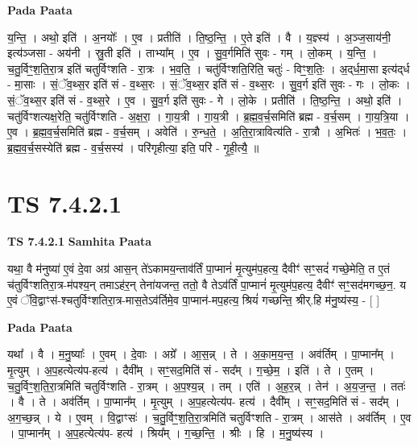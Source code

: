 \documentclass[17pt]{extarticle}
\begin{document}
\textbf{Pada Paata} \newline

य॒न्ति॒ । अथो॒ इति॑ । अ॒नयोः᳚ । ए॒व । प्रतीति॑ । ति॒ष्ठ॒न्ति॒ । ए॒ते इति॑ । वै । य॒ज्ञ्स्य॑ । अ॒ञ्ज॒साय॑नी॒ इत्य॑ञ्जसा - अय॑नी । स्रु॒ती इति॑ । ताभ्या᳚म् । ए॒व । सु॒व॒र्गमिति॑ सुवः - गम् । लो॒कम् । य॒न्ति॒ । च॒तु॒र्विꣳ॒॒श॒ति॒रा॒त्र इति॑ चतुर्विꣳशति - रा॒त्रः । भ॒व॒ति॒ । चतु॑र्विꣳशति॒रिति॒ चतुः॑ - विꣳ॒॒श॒तिः॒ । अ॒द्‌र्ध॒मा॒सा इत्य॑द्‌र्ध - मा॒साः । सं॒ॅव॒थ्स॒र इति॑ सं - व॒थ्स॒रः । सं॒ॅव॒थ्स॒र इति॑ सं - व॒थ्स॒रः । सु॒व॒र्ग इति॑ सुवः - गः । लो॒कः । सं॒ॅव॒थ्स॒र इति॑ सं - व॒थ्स॒रे । ए॒व । सु॒व॒र्ग इति॑ सुवः - गे । लो॒के । प्रतीति॑ । ति॒ष्ठ॒न्ति॒ । अथो॒ इति॑ । चतु॑र्विꣳशत्यक्ष॒रेति॒ चतु॑र्विꣳशति - अ॒क्ष॒रा॒ । गा॒य॒त्री । गा॒य॒त्री । ब्र॒ह्म॒व॒र्च॒समिति॑ ब्रह्म - व॒र्च॒सम् । गा॒य॒त्रि॒या । ए॒व । ब्र॒ह्म॒व॒र्च॒समिति॑ ब्रह्म - व॒र्च॒सम् । अवेति॑ । रु॒न्ध॒ते॒ । अ॒ति॒रा॒त्रावित्य॑ति - रा॒त्रौ । अ॒भितः॑ । भ॒व॒तः॒ । ब्र॒ह्म॒व॒र्च॒सस्येति॑ ब्रह्म - व॒र्च॒सस्य॑ । परि॑गृहीत्या॒ इति॒ परि॑ - गृ॒ही॒त्यै॒ ॥  \newline





\section{ TS 7.4.2.1 }

\textbf{TS 7.4.2.1 } \newline
\textbf{Samhita Paata} \newline

यथा॒ वै म॑नुष्या॑ ए॒वं दे॒वा अग्र॑ आस॒न् ते॑ऽकामय॒न्ताव॑र्तिं पा॒प्मानं॑ मृ॒त्युम॑प॒हत्य॒ दैवीꣳ॑ सꣳ॒॒सदं॑ गच्छे॒मेति॒ त ए॒तं च॑तुर्विꣳशतिरा॒त्र-म॑पश्य॒न् तमाऽह॑र॒न् तेना॑यजन्त॒ ततो॒ वै तेऽव॑र्तिं पा॒प्मानं॑ मृ॒त्युम॑प॒हत्य॒ दैवीꣳ॑ सꣳ॒॒सद॑मगच्छ॒न॒. य ए॒वं ॅवि॒द्वाꣳस॑-श्चतुर्विꣳशतिरा॒त्र-मास॒तेऽव॑र्तिमे॒व पा॒प्मान॑-मप॒हत्य॒ श्रियं॑ गच्छन्ति॒ श्रीर्.हि म॑नु॒ष्य॑स्य॒ - [  ] \newline

\textbf{Pada Paata} \newline

यथा᳚ । वै । म॒नु॒ष्याः᳚ । ए॒वम् । दे॒वाः । अग्रे᳚ । आ॒स॒न्न् । ते । अ॒का॒म॒य॒न्त॒ । अव॑र्तिम् । पा॒प्मान᳚म् । मृ॒त्युम् । अ॒प॒हत्येत्य॑प-हत्य॑ । दैवी᳚म् । सꣳ॒॒सद॒मिति॑ सं - सद᳚म् । ग॒च्छे॒म॒ । इति॑ । ते । ए॒तम् । च॒तु॒र्विꣳ॒॒श॒ति॒रा॒त्रमिति॑ चतुर्विꣳशति - रा॒त्रम् । अ॒प॒श्य॒न्न् । तम् । एति॑ । अ॒ह॒र॒न्न् । तेन॑ । अ॒य॒ज॒न्त॒ । ततः॑ । वै । ते । अव॑र्तिम् । पा॒प्मान᳚म् । मृ॒त्युम् । अ॒प॒हत्येत्य॑प- हत्य॑ । दैवी᳚म् । सꣳ॒॒सद॒मिति॑ सं - सद᳚म् । अ॒ग॒च्छ॒न्न् । ये । ए॒वम् । वि॒द्वाꣳसः॑ । च॒तु॒र्विꣳ॒॒श॒ति॒रा॒त्रमिति॑ चतुर्विꣳशति - रा॒त्रम् । आस॑ते । अव॑र्तिम् । ए॒व । पा॒प्मान᳚म् । अ॒प॒हत्येत्य॑प- हत्य॑ । श्रिय᳚म् । ग॒च्छ॒न्ति॒ । श्रीः । हि । म॒नु॒ष्य॑स्य ।  \newline
\end{document}
